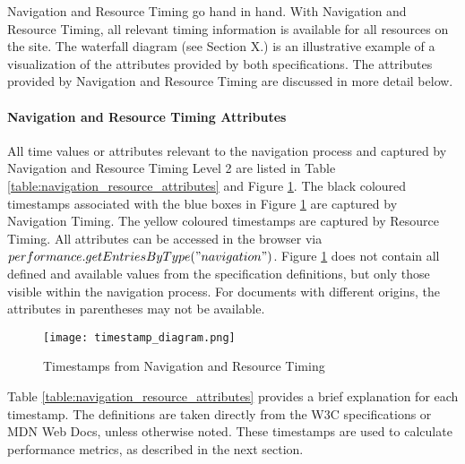 
Navigation and Resource Timing go hand in hand.
With Navigation and Resource Timing, all relevant timing information is available for all resources on the site.
The waterfall diagram (see Section X.) is an illustrative example of a visualization of the attributes provided by both specifications.
The attributes provided by Navigation and Resource Timing are discussed in more detail below.



\paragraph{Navigation and Resource Timing Attributes} %

All time values or attributes relevant to the navigation process and captured by Navigation and Resource Timing Level 2 are listed in Table \ref{table:navigation_resource_attributes} and Figure \ref{figure:navigation_resource_timestamps}.
The black coloured timestamps associated with the blue boxes in Figure \ref{figure:navigation_resource_timestamps} are captured by Navigation Timing.
The yellow coloured timestamps are captured by Resource Timing.
All attributes can be accessed in the browser via $performance.getEntriesByType("navigation")$.
Figure \ref{figure:navigation_resource_timestamps} does not contain all defined and available values from the specification definitions, but only those visible within the navigation process.
For documents with different origins, the attributes in parentheses may not be available. %


\begin{figure}[h!]
\begin{center}
\texttt{[image: timestamp\_diagram.png]}
\caption{Timestamps from Navigation and Resource Timing}
\label{figure:navigation_resource_timestamps}
\end{center}
\end{figure}


Table \ref{table:navigation_resource_attributes} provides a brief explanation for each timestamp.
The definitions are taken directly from the W3C specifications or MDN Web Docs, unless otherwise noted.
These timestamps are used to calculate performance metrics, as described in the next section.


